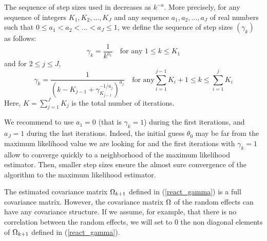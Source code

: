  The sequence of step sizes used in \monolix decreases as $k^{-a}$. More
precisely, for any sequence of integers $K_1,K_2,\ldots,K_J$ and any sequence $a_1,a_2,\ldots,a_J$
of real numbers such that $0\leq a_1 <a_2<\ldots<a_J\leq 1$, we define the sequence of step sizes
$(\gamma_k)$ as follows:
\begin{equation} \label{stepsize1}
\gamma_k = \frac{1}{k^{a_1}} \quad \mbox{for any } 1\leq k \leq K_1
\end{equation}
and for $2\leq j \leq J$,
\begin{equation} \label{stepsize2}
\gamma_k = \frac{1}{\left(k - K_{j-1}+\gamma_{K_{j-1}}^{-1/a_j}\right) ^{a_j}} \quad \mbox{for any
} \sum_{i=1}^{j-1} K_i +1\leq k \leq \sum_{i=1}^{j} K_i
\end{equation}
Here, $K=\sum_{j=1}^{J}K_j$ is the total number of iterations.

We recommend to use $a_1=0$ (that is $\gamma_k=1$) during the first iterations, and $a_J=1$ during
the last iterations. Indeed, the initial guess  $\theta_0$ may  be far  from the  maximum
likelihood value  we are looking for and the first iterations with $\gamma_k=1$ allow to converge
quickly to a neighborhood of the maximum likelihood estimator. Then, smaller step sizes ensure the
almost sure convergence of the algorithm to the maximum likelihood estimator.




 The estimated covariance matrix ${{\Omega}_{k+1}}$ defined in
(\ref{react_gamma}) is a full covariance matrix. However, the covariance matrix ${\Omega}$ of the
random effects can have any covariance structure. If we assume, for example, that there is no
correlation between the random effects, we will set to 0 the non diagonal elements of ${{\Omega}_{k+1}}$
defined in (\ref{react_gamma}).

